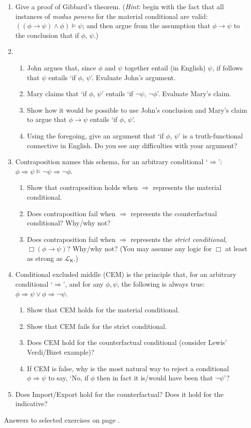 {\begin{enumerate}
\item Give a proof of Gibbard's theorem. (\emph{Hint:} begin with the fact that all instances of \emph{modus ponens}  for the material conditional are valid: $((\phi \to \psi)\wedge\phi)\vDash\psi$; and then argue from the assumption that $\phi\to\psi$ to the conclusion that if $\phi$, $\psi$.)
\item \begin{enumerate}
	\item John argues that, since $\phi$ and $\psi$ together entail (in English) $\psi$, if follows that $\psi$ entails `if $\phi$, $\psi$'. Evaluate John's argument.
	\item Mary claims that `if $\phi$, $\psi$' entails `if $\neg \psi$, $\neg\phi$'. Evaluate Mary's claim.
	\item Show how it would be possible to use John's conclusion and Mary's claim to argue that $\phi \to \psi$ entails `if $\phi$, $\psi$'.
	\item Using the foregoing, give an argument that `if $\phi$, $\psi$' is a truth-functional connective in English. Do you see any difficulties with your argument?
\end{enumerate}
\item Contraposition names this schema, for an arbitrary conditional `$\Rightarrow$': $\phi\Rightarrow\psi \vDash ¬\psi\Rightarrow ¬\phi$.
\begin{enumerate}
	\item Show that contraposition holds when $\Rightarrow$ represents the material conditional.
	\item Does contraposition fail when $\Rightarrow$ represents the counterfactual conditional? Why/why not?
	\item Does contraposition fail when $\Rightarrow$ represents the \emph{strict conditional}, $\Box(\phi \to \psi)$? Why/why not? (You may assume any logic for $\Box$ at least as strong as $\mathscr{L}_{\mathsf{K}}$.)
\end{enumerate}
\item Conditional excluded middle (CEM) is the principle that, for an arbitrary conditional `$\Rightarrow$', and for any $\phi, \psi$, the following is always true: $\phi\Rightarrow\psi \vee \phi\Rightarrow ¬\psi$. \begin{enumerate}
	\item Show that CEM holds for the material conditional.
	\item Show that CEM fails for the strict conditional.
	\item Does CEM hold for the counterfactual conditional (consider Lewis' Verdi/Bizet example)?
	\item If CEM is false, why is the most natural way to reject a conditional $\phi\Rightarrow\psi$ to say, `No, if $\phi$ then in fact it is/would have been that $¬\psi$'?
\end{enumerate}
\item Does Import/Export hold for the counterfactual? Does it hold for the indicative?
\end{enumerate}

Answers to selected exercises on page \pageref{ans:cond}.



}



	








